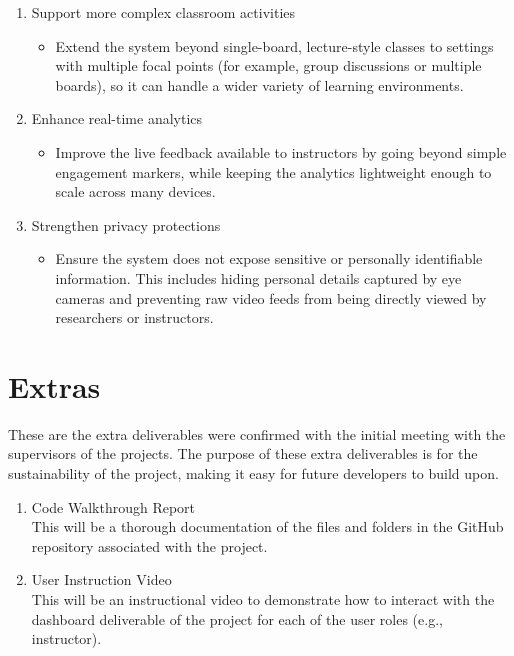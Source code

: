 \documentclass{article}
\begin{document}
\begin{enumerate}
    \item Support more complex classroom activities
    \begin{itemize}
        \item Extend the system beyond single-board, lecture-style classes to settings with multiple focal points (for example, group discussions or multiple boards), so it can handle a wider variety of learning environments.
    \end{itemize}

    \item Enhance real-time analytics
    \begin{itemize}
        \item Improve the live feedback available to instructors by going beyond simple engagement markers, while keeping the analytics lightweight enough to scale across many devices.
    \end{itemize}

    \item Strengthen privacy protections
    \begin{itemize}
        \item Ensure the system does not expose sensitive or personally identifiable information. This includes hiding personal details captured by eye cameras and preventing raw video feeds from being directly viewed by researchers or instructors.
    \end{itemize}
\end{enumerate}

\section{Extras}
These are the extra deliverables were confirmed with the initial meeting with the supervisors of the projects. 
The purpose of these extra deliverables is for the sustainability of the project, making it easy for future developers to build upon. 

\begin{enumerate}
    \item Code Walkthrough Report \\
    This will be a thorough documentation of the files and folders in the GitHub repository associated with the project. 

    \item User Instruction Video \\
    This will be an instructional video to demonstrate how to interact with the dashboard deliverable of the project for each of the user roles (e.g., instructor). 
\end{enumerate}
\end{document}
